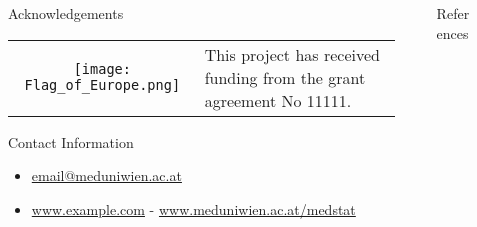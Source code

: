 \documentclass[final]{beamer}
\newlength{\sepmargin}
\newlength{\sepwid}
\newlength{\onecolwid}
\begin{document}
\begin{frame}[t]
\begin{columns}[t]
			\begin{column}{\sepmargin} \end{column}
		\end{columns} 
		
		\begin{columns}[t] %
			
			\begin{column}{\sepmargin} \end{column}
			\begin{column}{\onecolwid} %
				\begin{block}{\large Acknowledgements}
					\begin{center}
						\begin{tabular}{SL}
							\texttt{[image: Flag\_of\_Europe.png]}  &
							\footnotesize This project has received funding from the  grant agreement No 11111.
						\end{tabular}
					\end{center}
				\end{block}	
				\vspace*{-0.9cm}
				\begin{alertblock}{\large Contact Information}
					\vspace*{-0.5cm}
					\begin{footnotesize}
						\begin{itemize}
							\item \href{mailto:email@meduniwien.ac.at}{email@meduniwien.ac.at}
							\item \href{http://www.example.com/}{www.example.com} - \href{www.meduniwien.ac.at/medstat}{www.meduniwien.ac.at/medstat}
						\end{itemize}
					\end{footnotesize}	
					
				\end{alertblock}
			\end{column} %
			\begin{column}{\sepwid}\end{column} %
			\begin{column}{\onecolwid} %
				\begin{block}{\large References}
					\vspace*{-0.5cm}
					\nocite{*} %
					{\footnotesize
						}
				\end{block} 
			\end{column} %
			
			\begin{column}{\sepmargin}\end{column} %
			
		\end{columns} %
		
		
	\end{frame} %
	
\end{document}
